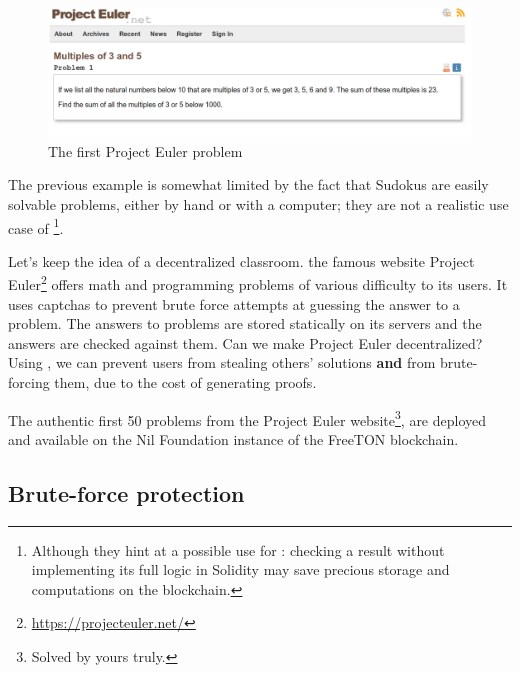 \documentclass[10pt,a4paper]{article}
\begin{document}
	\begin{figure}[!h]
	\centering
	\includegraphics[width=\textwidth]{euler}
	\caption{The first Project Euler problem}
\end{figure}

The previous example is somewhat limited by the fact that Sudokus are easily solvable problems, either by hand or with a computer; they are not a realistic use case of \zksnarks{}\footnote{Although they hint at a possible use for \zksnarks{}: checking a result without implementing its full logic in Solidity may save precious storage and computations on the blockchain.}.

Let's keep the idea of a decentralized classroom. the famous website Project Euler\footnote{\url{https://projecteuler.net/}} offers math and programming problems of various difficulty to its users. It uses captchas to prevent brute force attempts at guessing the answer to a problem. The answers to problems are stored statically on its servers and the answers are checked against them. Can we make Project Euler decentralized? Using \zksnarks{}, we can prevent users from stealing others' solutions \textbf{and} from brute-forcing them, due to the cost of generating proofs.

The authentic first 50 problems from the Project Euler website\footnote{Solved by yours truly.}, are deployed and available on the Nil Foundation instance of the FreeTON blockchain.

\subsection{Brute-force protection}
\label{subsec:brute-force}
\end{document}
